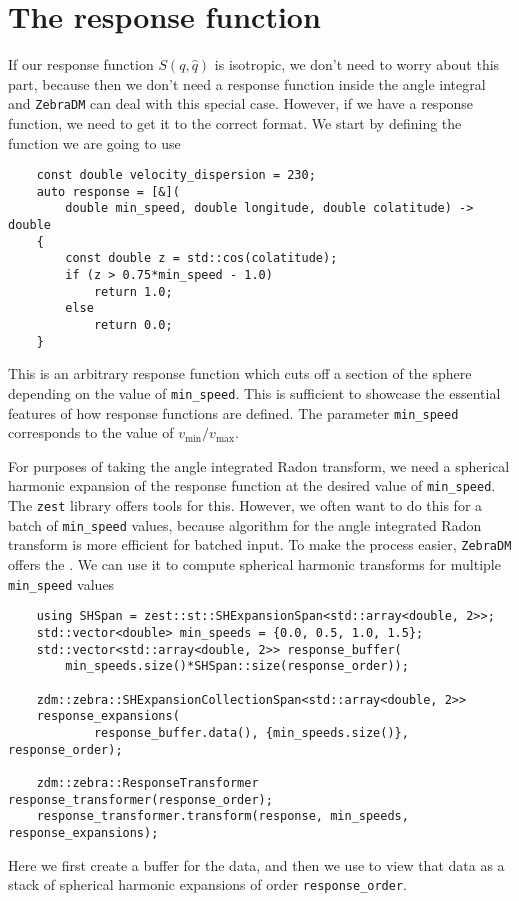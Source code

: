 \documentclass{article}
\newcommand{\unitv}[1]{\hat{#1}}
\begin{document}
\section{The response function}

If our response function $S(q, \unitv{q})$ is isotropic, we don't need to worry about this part, because then we don't need a response function inside the angle integral and \texttt{ZebraDM} can deal with this special case. However, if we have a response function, we need to get it to the correct format. We start by defining the function we are going to use
\begin{verbatim}
    const double velocity_dispersion = 230;
    auto response = [&](
        double min_speed, double longitude, double colatitude) -> double
    {
        const double z = std::cos(colatitude);
        if (z > 0.75*min_speed - 1.0)
            return 1.0;
        else
            return 0.0;
    }
\end{verbatim}
This is an arbitrary response function which cuts off a section of the sphere depending on the value of \texttt{min\_speed}. This is sufficient to showcase the essential features of how response functions are defined. The parameter \texttt{min\_speed} corresponds to the value of $v_\text{min}/v_\text{max}$.

For purposes of taking the angle integrated Radon transform, we need a spherical harmonic expansion of the response function at the desired value of \texttt{min\_speed}. The \texttt{zest} library offers tools for this. However, we often want to do this for a batch of \texttt{min\_speed} values, because algorithm for the angle integrated Radon transform is more efficient for batched input. To make the process easier, \texttt{ZebraDM} offers the . We can use it to compute spherical harmonic transforms for multiple \texttt{min\_speed} values
\begin{verbatim}
    using SHSpan = zest::st::SHExpansionSpan<std::array<double, 2>>;
    std::vector<double> min_speeds = {0.0, 0.5, 1.0, 1.5};
    std::vector<std::array<double, 2>> response_buffer(
        min_speeds.size()*SHSpan::size(response_order));

    zdm::zebra::SHExpansionCollectionSpan<std::array<double, 2>>
    response_expansions(
            response_buffer.data(), {min_speeds.size()}, response_order);

    zdm::zebra::ResponseTransformer response_transformer(response_order);
    response_transformer.transform(response, min_speeds, response_expansions);
\end{verbatim}
Here we first create a buffer for the data, and then we use  to view that data as a stack of spherical harmonic expansions of order \texttt{response\_order}.
\end{document}
